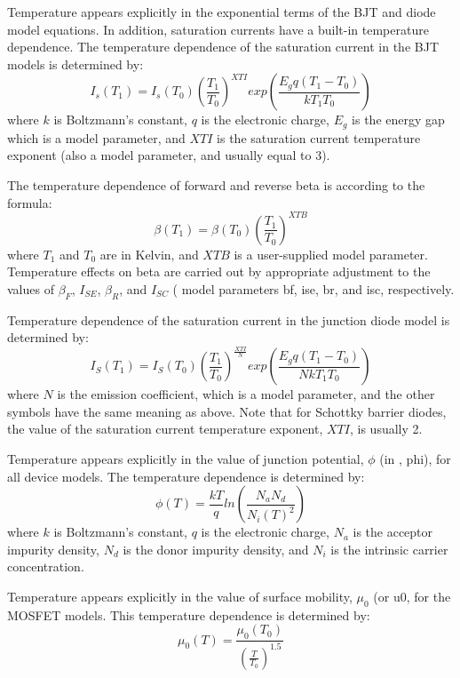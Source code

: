 Temperature appears explicitly in the exponential terms of the BJT and
diode model equations.  In addition, saturation currents have a
built-in temperature dependence.  The temperature dependence of the
saturation current in the BJT models is determined by:
\begin{displaymath}
I_s(T_1) = I_s(T_0)\left(\frac{T_1}{T_0}\right)^{XTI} exp\left(
\frac{E_gq(T_1 - T_0)}{kT_1T_0}\right)
\end{displaymath}
where $k$ is Boltzmann's constant, $q$ is the electronic charge, $E_g$ is
the energy gap which is a model parameter, and $XTI$ is the saturation
current temperature exponent (also a model parameter, and usually
equal to 3).

The temperature dependence of forward and reverse beta is according to
the formula:
\begin{displaymath}
\beta(T_1) = \beta(T_0)\left(\frac{T_1}{T_0}\right)^{XTB}
\end{displaymath}
where $T_1$ and $T_0$ are in Kelvin, and $XTB$ is a user-supplied model
parameter.  Temperature effects on beta are carried out by appropriate
adjustment to the values of $\beta_F$, $I_{SE}$, $\beta_R$, and
$I_{SC}$ ({\WRspice} model parameters {\vt bf, ise, br,} and {\vt isc,}
respectively.

Temperature dependence of the saturation current in the junction diode
model is determined by:
\begin{displaymath}
I_S(T_1) = I_S(T_0)\left(\frac{T_1}{T_0}\right)^{\frac{XTI}{N}}
exp\left(\frac{E_gq(T_1 - T_0)}{NkT_1T_0}\right)
\end{displaymath}
where $N$ is the emission coefficient, which is a model parameter, and
the other symbols have the same meaning as above.  Note that for
Schottky barrier diodes, the value of the saturation current
temperature exponent, $XTI$, is usually 2.

Temperature appears explicitly in the value of junction potential,
$\phi$ (in {\WRspice}, {\vt phi}), for all device models.  The
temperature dependence is determined by:
\begin{displaymath}
\phi(T) = \frac{kT}{q}ln\left(\frac{N_aN_d}{N_i(T)^2}\right)
\end{displaymath}
where $k$ is Boltzmann's constant, $q$ is the electronic charge, $N_a$ is
the acceptor impurity density, $N_d$ is the donor impurity density, and
$N_i$ is the intrinsic carrier concentration.

Temperature appears explicitly in the value of surface mobility,
$\mu_0$ (or {\vt u0}, for the MOSFET models.  This temperature
dependence is determined by:
\begin{displaymath}
\mu_0(T) = \frac{\mu_0(T_0)}{\left(\frac{T}{T_0}\right)^{1.5}}
\end{displaymath}

